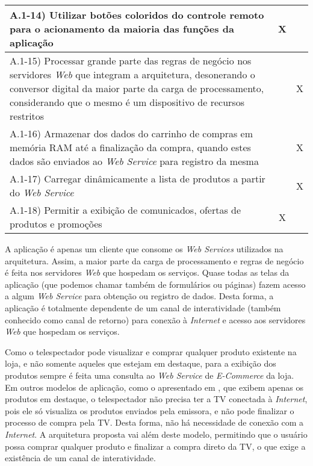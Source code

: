 \begin{center}
{\begin{tabular}{|p{11cm}|c|c|}
		\hline
		  A.1-14) Utilizar botões coloridos do controle remoto para o acionamento da maioria
		   das funções da aplicação &  X &    \\
		\hline
		  A.1-15) Processar grande parte das regras de negócio nos servidores \textit{Web} que integram a arquitetura,
		   desonerando o conversor digital da maior parte da carga de processamento, considerando
		   que o mesmo é um dispositivo de recursos restritos &   & X   \\
		\hline
		  A.1-16) Armazenar dos dados do carrinho de compras em memória RAM até a finalização da compra,
		   quando estes dados são enviados ao \textit{Web Service} para registro da mesma &   & X   \\
		\hline
		  A.1-17) Carregar dinâmicamente a lista de produtos a partir do \textit{Web Service} &   & X   \\
		\hline
		  A.1-18) Permitir a exibição de comunicados, ofertas de produtos e promoções & X &    \\
		\hline
	\end{tabular}
	\label{tab:app-tcommerce-requisitos}
}
\end{center}

A aplicação é apenas um cliente que consome os \textit{Web Services} utilizados na arquitetura.
Assim, a maior parte da carga de processamento e regras de negócio é feita nos 
servidores \textit{Web} que hospedam os serviços. Quase todas as telas da aplicação
(que podemos chamar também de formulários ou páginas) fazem acesso a algum \textit{Web Service}
para obtenção ou registro de dados. Desta forma, a aplicação é totalmente dependente
de um canal de interatividade (também conhecido como canal de retorno)
para conexão à \textit{Internet} e acesso aos servidores \textit{Web} que hospedam os serviços.

Como o telespectador pode visualizar e comprar qualquer produto existente na loja,
e não somente aqueles que estejam em destaque, para a exibição dos produtos
sempre é feita uma consulta ao \textit{Web Service} de \textit{E-Commerce} da loja.
Em outros modelos de aplicação, como o apresentado em \cite{extra-vendas-tvd},
que exibem apenas os produtos em destaque, o telespectador não precisa
ter a TV conectada à \textit{Internet}, pois ele só visualiza os produtos 
enviados pela emissora, e não pode finalizar o processo de compra
pela TV. Desta forma, não há necessidade de conexão com a \textit{Internet}.
A arquitetura proposta vai além deste modelo, permitindo que o usuário possa comprar
qualquer produto e finalizar a compra direto da TV, o que exige a existência de um canal 
de interatividade.

